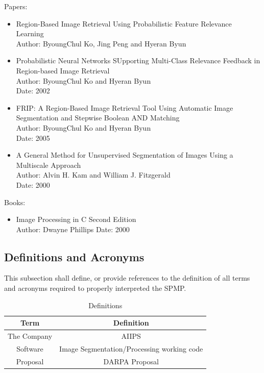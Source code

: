 \documentclass[12pt]{article}
\begin{document}
Papers:
\begin{itemize}
  \item Region-Based Image Retrieval Using Probabilistic Feature Relevance Learning\\
        Author: ByoungChul Ko, Jing Peng and Hyeran Byun
  \item Probabilistic Neural Networks SUpporting Multi-Class Relevance Feedback in Region-based Image Retrieval\\
        Author: ByoungChul Ko and Hyeran Byun\\
        Date: 2002
  \item FRIP: A Region-Based Image Retrieval Tool Using Automatic Image Segmentation and Stepwise Boolean AND Matching\\
        Author: ByoungChul Ko and Hyeran Byun\\
        Date: 2005
  \item A General Method for Unsupervised Segmentation of Images Using a Multiscale Approach\\
        Author: Alvin H. Kam and William J. Fitzgerald\\
        Date: 2000
\end{itemize}

Books:
\begin{itemize}
  \item Image Processing in C Second Edition\\
        Author: Dwayne Phillips
        Date: 2000
\end{itemize}

\subsection{Definitions and Acronyms}
This subsection shall define, or provide references to the definition of all terms and acronyms required to properly interpreted the SPMP.
\begin{table}[H]\centering
\begin{tabular}{|c|c|}
  \hline
  Term & Definition \\
   \hline
   The Company & AIIPS \\
   \hline
   Software & Image Segmentation/Processing working code\\
   \hline
   Proposal & DARPA Proposal\\
   \hline
\end{tabular}
\caption{Definitions}
\end{table}
\end{document}
